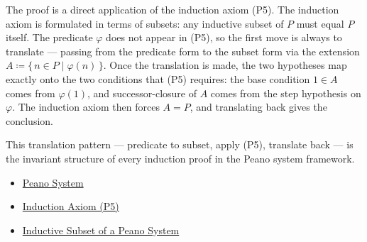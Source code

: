 \begin{remark*}
The proof is a direct application of the induction axiom (P5). The induction
axiom is formulated in terms of subsets: any inductive subset of $P$ must
equal $P$ itself. The predicate $\varphi$ does not appear in (P5), so the
first move is always to translate --- passing from the predicate form to the
subset form via the extension $A \coloneqq \{\,n \in P \mid \varphi(n)\,\}$.
Once the translation is made, the two hypotheses map exactly onto the two
conditions that (P5) requires: the base condition $1 \in A$ comes from
$\varphi(1)$, and successor-closure of $A$ comes from the step hypothesis on
$\varphi$. The induction axiom then forces $A = P$, and translating back gives
the conclusion.

This translation pattern --- predicate to subset, apply (P5), translate back
--- is the invariant structure of every induction proof in the Peano system
framework.
\end{remark*}

\begin{dependencies}
\begin{itemize}
  \item \hyperref[def:peano-system]{Peano System}
  \item \hyperref[ax:peano-induction]{Induction Axiom (P5)}
  \item \hyperref[def:inductive-subset-of-peano-system]{Inductive Subset of a Peano System}
\end{itemize}
\end{dependencies}


\clearpage
